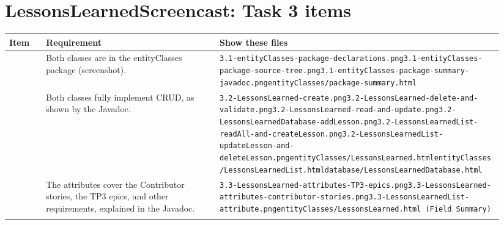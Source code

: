 \documentclass[10pt]{article}
\begin{document}
\section*{LessonsLearnedScreencast: Task 3 items}
\setlength{\tabcolsep}{4pt}\begin{longtable}{@{}>{\raggedright\arraybackslash}p{0.07\linewidth} >{\raggedright\arraybackslash}p{0.33\linewidth} >{\raggedright\arraybackslash}p{0.54\linewidth}@{}}
\toprule\textbf{Item} & \textbf{Requirement} & \textbf{Show these files} \\\midrule\endhead
3.1 & Both classes are in the entityClasses package (screenshot). & {\scriptsize \texttt{3.1-entityClasses-package-declarations.png}\newline \texttt{3.1-entityClasses-package-source-tree.png}\newline \texttt{3.1-entityClasses-package-summary-javadoc.png}\newline \texttt{entityClasses/package-summary.html}} \\ \addlinespace[3pt]
3.2 & Both classes fully implement CRUD, as shown by the Javadoc. & {\scriptsize \texttt{3.2-LessonsLearned-create.png}\newline \texttt{3.2-LessonsLearned-delete-and-validate.png}\newline \texttt{3.2-LessonsLearned-read-and-update.png}\newline \texttt{3.2-LessonsLearnedDatabase-addLesson.png}\newline \texttt{3.2-LessonsLearnedList-readAll-and-createLesson.png}\newline \texttt{3.2-LessonsLearnedList-updateLesson-and-deleteLesson.png}\newline \texttt{entityClasses/LessonsLearned.html}\newline \texttt{entityClasses/LessonsLearnedList.html}\newline \texttt{database/LessonsLearnedDatabase.html}} \\ \addlinespace[3pt]
3.3 & The attributes cover the Contributor stories, the TP3 epics, and other requirements, explained in the Javadoc. & {\scriptsize \texttt{3.3-LessonsLearned-attributes-TP3-epics.png}\newline \texttt{3.3-LessonsLearned-attributes-contributor-stories.png}\newline \texttt{3.3-LessonsLearnedList-attribute.png}\newline \texttt{entityClasses/LessonsLearned.html (Field Summary)}} \\ \addlinespace[3pt]

\end{longtable}
\end{document}
